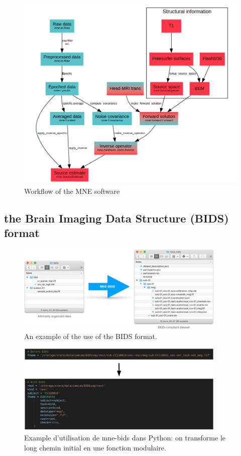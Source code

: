 \begin{figure}[ht]
    \centering
    \includegraphics[width=13cm]{images_report/workflow_of_the_mne_software.png}
    \caption[Workflow of the MNE software]%
    {Workflow of the MNE software \cite{GramfortEtAl2013a}}
    \label{workflow_mne}
\end{figure}


\subsection{the Brain Imaging Data Structure (BIDS) format}

\begin{figure}[ht]
    \centering
    \includegraphics[width=10cm]{images_report/BIDS.png}
    \caption{An example of the use of the BIDS format.}
    \label{BIDS}
\end{figure}

\begin{figure}[ht]
    \centering
    \includegraphics[width=10cm]{images_report/bids_example.png}
    \caption[Example d'utilisation de mne-bids]%
    {Example d'utilisation de mne-bids dans Python: on transforme le long chemin initial en une fonction modulaire.}
    \label{bids_example}
\end{figure}

